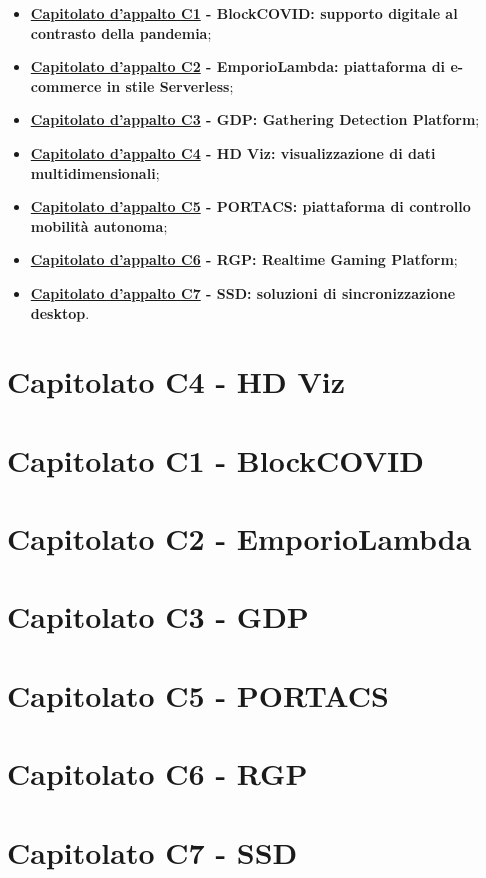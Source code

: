 \documentclass{article}
\begin{document}
\begin{itemize}
	\item \textbf{\href{https://www.math.unipd.it/~tullio/IS-1/2020/Progetto/C1.pdf}{Capitolato d'appalto C1} - BlockCOVID: supporto digitale al contrasto della pandemia};
	\item \textbf{\href{https://www.math.unipd.it/~tullio/IS-1/2020/Progetto/C2.pdf}{Capitolato d'appalto C2} - EmporioLambda: piattaforma di e-commerce in stile Serverless};
	\item \textbf{\href{https://www.math.unipd.it/~tullio/IS-1/2020/Progetto/C3.pdf}{Capitolato d'appalto C3} - GDP: Gathering Detection Platform};
	\item \textbf{\href{https://www.math.unipd.it/~tullio/IS-1/2020/Progetto/C4.pdf}{Capitolato d'appalto C4} - HD Viz: visualizzazione di dati multidimensionali};
	\item \textbf{\href{https://www.math.unipd.it/~tullio/IS-1/2020/Progetto/C5.pdf}{Capitolato d'appalto C5} - PORTACS: piattaforma di controllo mobilità autonoma};
	\item \textbf{\href{https://sesaspa-my.sharepoint.com/:b:/g/personal/s_dindo_vargroup_it/EThvay0f6KVCoXydYOce2lkBt-MYcnW1yafRXFXVIOIsHg?e=2emZZI}{Capitolato d'appalto C6} - RGP: Realtime Gaming Platform};
	\item \textbf{\href{https://www.math.unipd.it/~tullio/IS-1/2020/Progetto/C7.pdf}{Capitolato d'appalto C7} - SSD: soluzioni di sincronizzazione desktop}.
\end{itemize}

\newpage
\section{Capitolato C4 - HD Viz}
\label{sec:c4}


\newpage
\section{Capitolato C1 - BlockCOVID}
\label{sec:c1}


\newpage
\section{Capitolato C2 - EmporioLambda}
\label{sec:c2}


\newpage
\section{Capitolato C3 - GDP}
\label{sec:c3}


\newpage
\section{Capitolato C5 - PORTACS}
\label{sec:c5}


\newpage
\section{Capitolato C6 - RGP}
\label{sec:c6}


\newpage
\section{Capitolato C7 - SSD}
\label{sec:c7}

\end{document}

